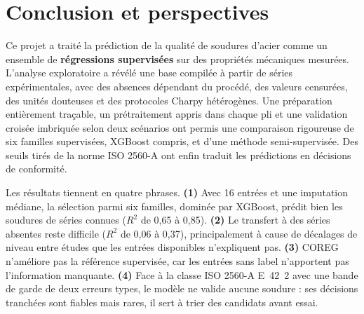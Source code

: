\section{Conclusion et perspectives}
\label{sec:conclusion}

Ce projet a traité la prédiction de la qualité de soudures d'acier comme un
ensemble de \textbf{régressions supervisées} sur des propriétés mécaniques
mesurées. L'analyse exploratoire a révélé une base compilée à partir de séries
expérimentales, avec des absences dépendant du procédé, des valeurs censurées,
des unités douteuses et des protocoles Charpy hétérogènes. Une préparation
entièrement traçable, un prétraitement appris dans chaque pli et une validation
croisée imbriquée selon deux scénarios ont permis une comparaison rigoureuse de
six familles supervisées, XGBoost compris, et d'une méthode semi-supervisée. Des
seuils tirés de la norme ISO 2560-A ont enfin traduit les prédictions en
décisions de conformité.

Les résultats tiennent en quatre phrases. \textbf{(1)} Avec 16 entrées et une
imputation médiane, la sélection parmi six familles, dominée par XGBoost, prédit
bien les soudures de séries connues ($R^2$ de 0,65 à 0,85). \textbf{(2)} Le
transfert à des séries absentes reste difficile ($R^2$ de 0,06 à 0,37),
principalement à cause de décalages de niveau entre études que les entrées
disponibles n'expliquent pas. \textbf{(3)} COREG n'améliore pas la référence
supervisée, car les entrées sans label n'apportent pas l'information manquante.
\textbf{(4)} Face à la classe ISO 2560-A E~42~2 avec une bande de garde de deux
erreurs types, le modèle ne valide aucune soudure : ses décisions tranchées sont
fiables mais rares, il sert à trier des candidats avant essai.

